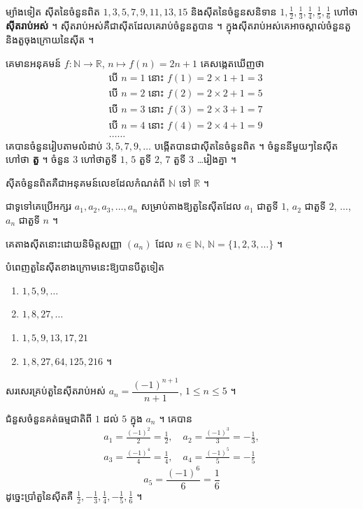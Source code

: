 ម្យ៉ាងទៀត ស៊ីតនៃចំនួនពិត $1, 3, 5, 7, 9, 11, 13, 15$ និងស៊ីតនៃចំនួនសនិទាន $1, \frac{1}{2}, \frac{1}{3}, \frac{1}{4}, \frac{1}{5}, \frac{1}{6}$ ហៅថា \textbf{ស៊ីតរាប់អស់} ។ ស៊ីតរាប់អស់គឺជាស៊ីតដែលគេរាប់ចំនួនតួបាន ។ ក្នុងស៊ីតរាប់អស់គេអាចស្គាល់ចំនួនតួនិងតួចុងក្រោយនៃស៊ីត ។

\begin{example}[ឧទាហរណ៍ ២]
គេមានអនុគមន៍ $f : \mathbb{N} \to \mathbb{R}$, $n \mapsto f(n) = 2n + 1$ គេសង្កេតឃើញថា
\[
\begin{aligned}
&\text{បើ } n = 1 \text{ នោះ } f(1) = 2 \times 1 + 1 = 3\\
&\text{បើ } n = 2 \text{ នោះ } f(2) = 2 \times 2 + 1 = 5\\
&\text{បើ } n = 3 \text{ នោះ } f(3) = 2 \times 3 + 1 = 7\\
&\text{បើ } n = 4 \text{ នោះ } f(4) = 2 \times 4 + 1 = 9\\
&\ldots\ldots
\end{aligned}
\]
គេបានចំនួនរៀបតាមលំដាប់ $3, 5, 7, 9, \ldots$ បង្កើតបានជាស៊ីតនៃចំនួនពិត ។ ចំនួននីមួយៗនៃស៊ីតហៅថា \textbf{តួ} ។ ចំនួន $3$ ហៅថាតួទី $1$, $5$ តួទី $2$, $7$ តួទី $3$ \ldots រៀងគ្នា ។
\end{example}

\begin{definition}
ស៊ីតចំនួនពិតគឺជាអនុគមន៍លេខដែលកំណត់ពី $\mathbb{N}$ ទៅ $\mathbb{R}$ ។
\end{definition}

ជាទូទៅគេប្រើអក្សរ $a_1, a_2, a_3, \ldots, a_n$ សម្រាប់តាងឱ្យតួនៃស៊ីតដែល $a_1$ ជាតួទី $1$, $a_2$ ជាតួទី $2$, $\ldots$, $a_n$ ជាតួទី $n$ ។

គេតាងស៊ីតនោះដោយនិមិត្តសញ្ញា $(a_n)$ ដែល $n \in \mathbb{N}$, $\mathbb{N} = \{1, 2, 3, \ldots\}$ ។

\begin{example}[លំហាត់គំរូ ១]
បំពេញតួនៃស៊ីតខាងក្រោមនេះឱ្យបានបីតួទៀត
\begin{enumerate}[a]
  \item $1, 5, 9, \ldots$
  \item $1, 8, 27, \ldots$
\end{enumerate}
\end{example}
\ans
\begin{enumerate}[a]
  \item $1, 5, 9, 13, 17, 21$
  \item $1, 8, 27, 64, 125, 216$ ។
\end{enumerate}

\begin{example}[លំហាត់គំរូ ២]
សរសេរគ្រប់តួនៃស៊ីតរាប់អស់ $a_n = \dfrac{(-1)^{n+1}}{n+1}$, $1 \le n \le 5$ ។
\end{example}
\ans
ជំនួសចំនួនគត់ធម្មជាតិពី $1$ ដល់ $5$ ក្នុង $a_n$ ។ គេបាន
\[
\begin{gathered} a_1 = \frac{(-1)^2}{2} = \frac{1}{2},\quad a_2 = \frac{(-1)^3}{3} = -\frac{1}{3},\\ a_3 = \frac{(-1)^4}{4} = \frac{1}{4},\quad a_4 = \frac{(-1)^5}{5} = -\frac{1}{5} \end{gathered}
\]
\[
a_5 = \frac{(-1)^6}{6} = \frac{1}{6}
\]
ដូច្នេះប្រាំតួនៃស៊ីតគឺ $\frac{1}{2}, -\frac{1}{3}, \frac{1}{4}, -\frac{1}{5}, \frac{1}{6}$ ។


